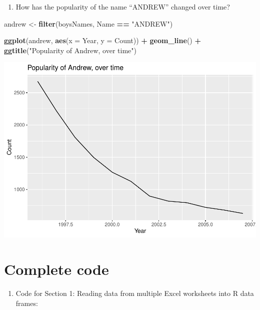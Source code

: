 \documentclass[
]{book}
\newenvironment{Shaded}{\begin{snugshade}}{\end{snugshade}}
\newcommand{\DataTypeTok}[1]{\textcolor[rgb]{0.13,0.29,0.53}{#1}}
\newcommand{\KeywordTok}[1]{\textcolor[rgb]{0.13,0.29,0.53}{\textbf{#1}}}
\newcommand{\NormalTok}[1]{#1}
\newcommand{\OperatorTok}[1]{\textcolor[rgb]{0.81,0.36,0.00}{\textbf{#1}}}
\newcommand{\StringTok}[1]{\textcolor[rgb]{0.31,0.60,0.02}{#1}}
\providecommand{\tightlist}{%
  \setlength{\itemsep}{0pt}\setlength{\parskip}{0pt}}
\begin{document}
\begin{enumerate}
\def\labelenumi{\arabic{enumi}.}
\setcounter{enumi}{3}
\tightlist
\item
  How has the popularity of the name ``ANDREW'' changed over time?
\end{enumerate}

\begin{Shaded}
\begin{Highlighting}[]
\NormalTok{andrew \textless{}{-}}\StringTok{ }\KeywordTok{filter}\NormalTok{(boysNames, Name }\OperatorTok{==}\StringTok{ "ANDREW"}\NormalTok{)}

\KeywordTok{ggplot}\NormalTok{(andrew, }\KeywordTok{aes}\NormalTok{(}\DataTypeTok{x =}\NormalTok{ Year, }\DataTypeTok{y =}\NormalTok{ Count)) }\OperatorTok{+}
\StringTok{    }\KeywordTok{geom\_line}\NormalTok{() }\OperatorTok{+}
\StringTok{    }\KeywordTok{ggtitle}\NormalTok{(}\StringTok{"Popularity of Andrew, over time"}\NormalTok{)}
\end{Highlighting}
\end{Shaded}

\includegraphics{R/RDataWrangling/figures/unnamed-chunk-286-1.pdf}

\hypertarget{complete-code}{%
\section{Complete code}\label{complete-code}}

\begin{enumerate}
\def\labelenumi{\arabic{enumi}.}
\tightlist
\item
  Code for Section 1: Reading data from multiple Excel worksheets into R data frames:
\end{enumerate}
\end{document}
